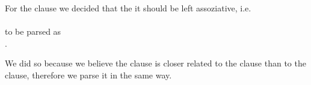 For the  clause we decided that the it should be left
assoziative, i.e. \\
 \\
to be parsed as \\
. 

We did so because we believe the  clause is closer
related to the  clause than to the 
clause, therefore we parse it in the same way.


